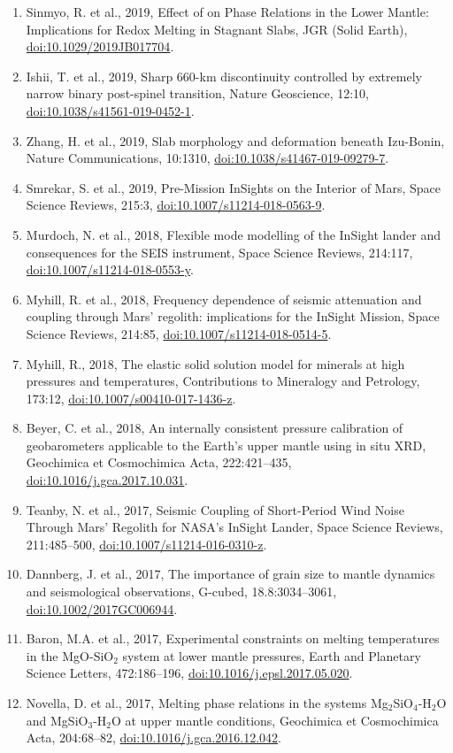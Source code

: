 \documentclass[11pt,twoside,a4paper]{article}
\newcommand{\doi}[1]{\href{http://dx.doi.org/#1}{doi:#1}}
\begin{document}
\begin{enumerate}
\item Sinmyo, R. et al., 2019, Effect of  on Phase Relations in the Lower Mantle: Implications for Redox Melting in Stagnant Slabs, JGR (Solid Earth), \doi{10.1029/2019JB017704}.
\item Ishii, T. et al., 2019, Sharp 660-km discontinuity controlled by extremely narrow binary post-spinel transition, Nature Geoscience, 12:10, \doi{10.1038/s41561-019-0452-1}.
\item Zhang, H. et al., 2019, Slab morphology and deformation beneath Izu-Bonin, Nature Communications, 10:1310, \doi{10.1038/s41467-019-09279-7}.
\item Smrekar, S. et al., 2019, Pre-Mission InSights on the Interior of Mars, Space Science Reviews, 215:3, \doi{10.1007/s11214-018-0563-9}.
\item Murdoch, N. et al., 2018, Flexible mode modelling of the InSight lander and consequences for the SEIS instrument, Space Science Reviews, 214:117, \doi{10.1007/s11214-018-0553-y}.
\item Myhill, R. et al., 2018, Frequency dependence of seismic attenuation and coupling through Mars' regolith: implications for the InSight Mission, Space Science Reviews, 214:85, \doi{10.1007/s11214-018-0514-5}.
\item Myhill, R., 2018, The elastic solid solution model for minerals at high pressures and temperatures, Contributions to Mineralogy and Petrology, 173:12, \doi{10.1007/s00410-017-1436-z}.
\item Beyer, C. et al., 2018, An internally consistent pressure calibration of geobarometers applicable to the Earth's upper mantle using in situ XRD, Geochimica et Cosmochimica Acta, 222:421--435, \doi{10.1016/j.gca.2017.10.031}.
\item Teanby, N. et al., 2017, Seismic Coupling of Short-Period Wind Noise Through Mars' Regolith for NASA's InSight Lander, Space Science Reviews, 211:485--500, \doi{10.1007/s11214-016-0310-z}.
\item Dannberg, J. et al., 2017, The importance of grain size to mantle dynamics and seismological observations, G-cubed, 18.8:3034--3061, \doi{10.1002/2017GC006944}.
\item Baron, M.A. et al., 2017, Experimental constraints on melting temperatures in the MgO-SiO$_2$ system at lower mantle pressures, Earth and Planetary Science Letters, 472:186--196, \doi{10.1016/j.epsl.2017.05.020}.
\item Novella, D. et al., 2017, Melting phase relations in the systems Mg$_2$SiO$_4$-H$_2$O and MgSiO$_3$-H$_2$O at upper mantle conditions, Geochimica et Cosmochimica Acta, 204:68--82, \doi{10.1016/j.gca.2016.12.042}.

\end{enumerate}
\end{document}
